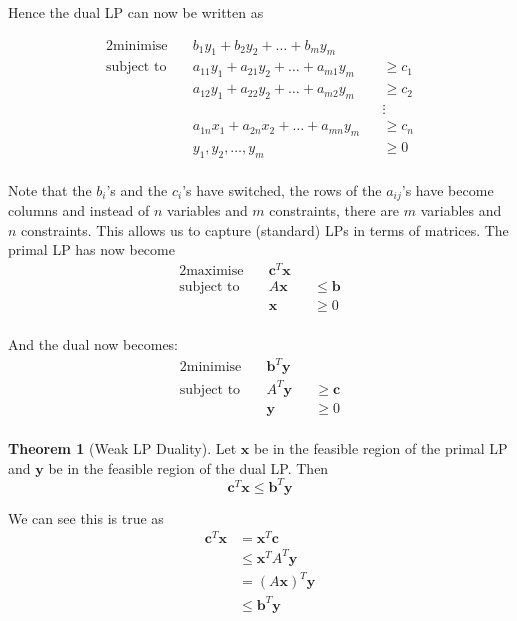 \documentclass{article}
\theoremstyle{plain}
\theoremstyle{definition}
\newtheorem{thm}{Theorem}
\begin{document}
        Hence the dual LP can now be written as 

        \begin{alignat*}{2}
        \text{minimise} &\quad b_1 y_1 + b_2 y_2 + \ldots + b_m y_m  && \\
        \text{subject to} &\quad a_{11}y_1 + a_{21}y_2 + \ldots + a_{m1}y_m &&\geq c_1 \\
        &\quad a_{12}y_1 + a_{22}y_2 + \ldots + a_{m2}y_m &&\geq c_2 \\
        &    &&  \vdots \\ 
        &\quad a_{1n}x_1 + a_{2n}x_2 + \ldots + a_{mn}y_m &&\geq c_n \\
        &\quad y_1,y_2,\ldots,y_m &&\geq 0 \\
        \end{alignat*}

        Note that the $b_i$'s and the $c_i$'s have switched, the rows of the $a_{ij}$'s have become columns and instead of $n$ variables and $m$ constraints, there are $m$ variables and $n$ constraints. This allows us to capture (standard) LPs in terms of matrices. The primal LP has now become
        \begin{alignat*}{2}
        \text{maximise} &\quad \mathbf{c}^T \mathbf{x}  && \\
        \text{subject to} &\quad A \mathbf{x} &&\leq \mathbf{b} \\
        &\quad \mathbf{x} &&\geq 0 \\
        \end{alignat*}
        
        And the dual now becomes:
        \begin{alignat*}{2}
        \text{minimise} &\quad \mathbf{b}^T \mathbf{y}  && \\
        \text{subject to} &\quad A^T \mathbf{y} &&\geq \mathbf{c} \\
        &\quad \mathbf{y} &&\geq 0 \\
        \end{alignat*}

        \begin{thm}[Weak LP Duality]
            Let $\mathbf{x}$ be in the feasible region of the primal LP and $\mathbf{y}$ be in the feasible region of the dual LP. Then
            \[ \mathbf{c}^T \mathbf{x} \leq \mathbf{b}^T \mathbf{y} \]
        \end{thm}

        We can see this is true as
        \begin{align*}
            \mathbf{c}^T \mathbf{x} &= \mathbf{x}^T \mathbf{c} \\
            &\leq \mathbf{x}^T A^T \mathbf{y} \\
            &= (A \mathbf{x})^T \mathbf{y} \\
            &\leq \mathbf{b}^T \mathbf{y}
        \end{align*}
\end{document}

